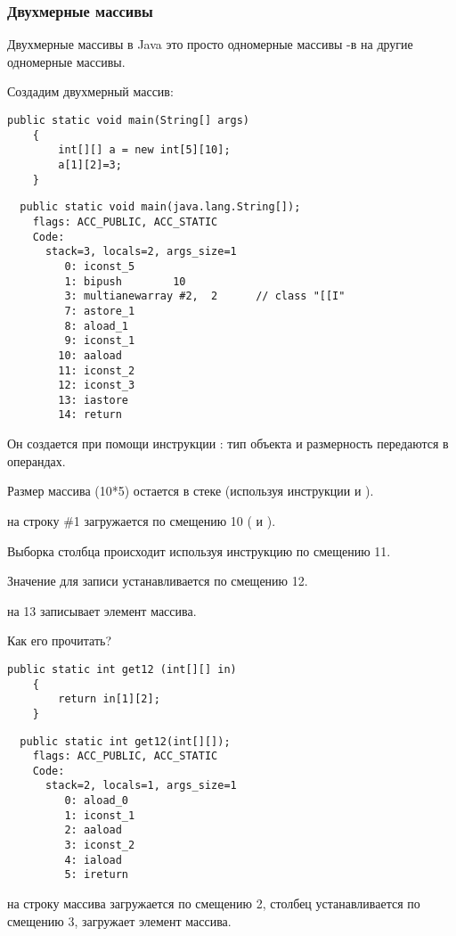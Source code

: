 \subsubsection{Двухмерные массивы}


Двухмерные массивы в Java это просто одномерные массивы -в на другие одномерные 
массивы.

Создадим двухмерный массив:

\begin{lstlisting}[style=customjava]
	public static void main(String[] args)
	{
		int[][] a = new int[5][10];
		a[1][2]=3;
	}
\end{lstlisting}

\begin{lstlisting}
  public static void main(java.lang.String[]);
    flags: ACC_PUBLIC, ACC_STATIC
    Code:
      stack=3, locals=2, args_size=1
         0: iconst_5      
         1: bipush        10
         3: multianewarray #2,  2      // class "[[I"
         7: astore_1      
         8: aload_1       
         9: iconst_1      
        10: aaload        
        11: iconst_2      
        12: iconst_3      
        13: iastore       
        14: return        
\end{lstlisting}


Он создается при помощи инструкции : тип объекта и размерность передаются
в операндах.

Размер массива (10*5) остается в стеке (используя инструкции  и ).


 на строку \#1 загружается по смещению 10 ( и ).

Выборка столбца происходит используя инструкцию  по смещению 11.

Значение для записи устанавливается по смещению 12.

 на 13 записывает элемент массива.

Как его прочитать?

\begin{lstlisting}[style=customjava]
	public static int get12 (int[][] in)
	{
		return in[1][2];
	}
\end{lstlisting}

\begin{lstlisting}
  public static int get12(int[][]);
    flags: ACC_PUBLIC, ACC_STATIC
    Code:
      stack=2, locals=1, args_size=1
         0: aload_0       
         1: iconst_1      
         2: aaload        
         3: iconst_2      
         4: iaload        
         5: ireturn       
\end{lstlisting}


 на строку массива загружается по смещению 2, 
столбец устанавливается по смещению 3,  загружает элемент массива.
